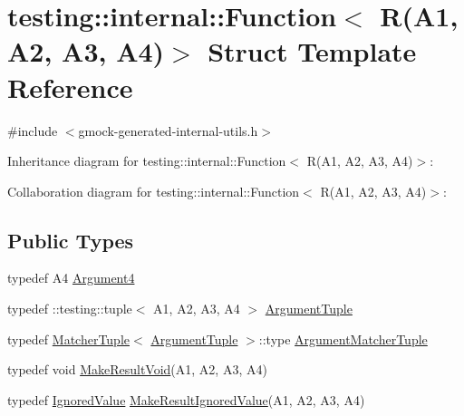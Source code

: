 \hypertarget{structtesting_1_1internal_1_1_function_3_01_r_07_a1_00_01_a2_00_01_a3_00_01_a4_08_4}{}\section{testing\+:\+:internal\+:\+:Function$<$ R(A1, A2, A3, A4)$>$ Struct Template Reference}
\label{structtesting_1_1internal_1_1_function_3_01_r_07_a1_00_01_a2_00_01_a3_00_01_a4_08_4}


{\ttfamily \#include $<$gmock-\/generated-\/internal-\/utils.\+h$>$}



Inheritance diagram for testing\+:\+:internal\+:\+:Function$<$ R(A1, A2, A3, A4)$>$\+:


Collaboration diagram for testing\+:\+:internal\+:\+:Function$<$ R(A1, A2, A3, A4)$>$\+:
\subsection*{Public Types}
\begin{DoxyCompactItemize}
\item 
typedef A4 \hyperlink{structtesting_1_1internal_1_1_function_3_01_r_07_a1_00_01_a2_00_01_a3_00_01_a4_08_4_ae5039423598ab0fecd4f594acbf34d85}{Argument4}
\item 
typedef \+::testing\+::tuple$<$ A1, A2, A3, A4 $>$ \hyperlink{structtesting_1_1internal_1_1_function_3_01_r_07_a1_00_01_a2_00_01_a3_00_01_a4_08_4_a8ad9e0ae57a766f80a9816ad45626812}{Argument\+Tuple}
\item 
typedef \hyperlink{structtesting_1_1internal_1_1_matcher_tuple}{Matcher\+Tuple}$<$ \hyperlink{structtesting_1_1internal_1_1_function_3_01_r_07_08_4_ad483c3128c470d8cdb55c3ac1c575c11}{Argument\+Tuple} $>$\+::type \hyperlink{structtesting_1_1internal_1_1_function_3_01_r_07_a1_00_01_a2_00_01_a3_00_01_a4_08_4_a9524b18868ab632a90d4cb6917057a14}{Argument\+Matcher\+Tuple}
\item 
typedef void \hyperlink{structtesting_1_1internal_1_1_function_3_01_r_07_a1_00_01_a2_00_01_a3_00_01_a4_08_4_af7462da27e87a9d580e7f9748ebc5754}{Make\+Result\+Void}(A1, A2, A3, A4)
\item 
typedef \hyperlink{classtesting_1_1internal_1_1_ignored_value}{Ignored\+Value} \hyperlink{structtesting_1_1internal_1_1_function_3_01_r_07_a1_00_01_a2_00_01_a3_00_01_a4_08_4_a6736086d1c8ba25788add1e5180207f9}{Make\+Result\+Ignored\+Value}(A1, A2, A3, A4)
\end{DoxyCompactItemize}


